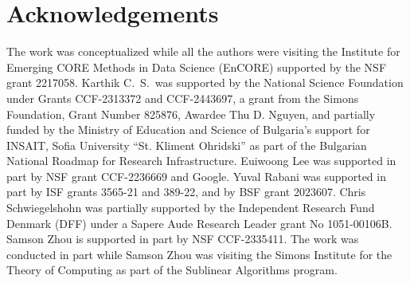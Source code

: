 \documentclass[11pt]{article}
\begin{document}
\section*{Acknowledgements}
The work was conceptualized while all the authors were visiting the Institute for Emerging CORE Methods in Data Science (EnCORE) supported by the NSF grant 2217058. 
Karthik C.\ S.\ was supported by the National Science Foundation under Grants CCF-2313372 and CCF-2443697, a grant from the Simons Foundation, Grant Number 825876, Awardee Thu D. Nguyen, and partially funded by the Ministry of Education and Science of Bulgaria's support for INSAIT, Sofia University ``St. Kliment Ohridski'' as part of the Bulgarian National Roadmap for Research Infrastructure. Euiwoong Lee was supported in part by NSF grant CCF-2236669 and Google. Yuval Rabani was supported in part by ISF grants 3565-21 and 389-22, and by BSF grant 2023607. Chris Schwiegelshohn was partially supported by the Independent Research Fund
Denmark (DFF) under a Sapere Aude Research Leader grant No 1051-00106B.
Samson Zhou is supported in part by NSF CCF-2335411. 
The work was conducted in part while Samson Zhou was visiting the Simons Institute for the Theory of Computing as part of the Sublinear Algorithms program.


\def\shortbib{0}


\end{document}
